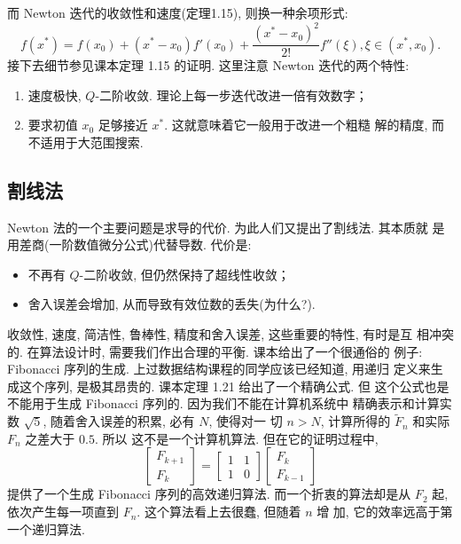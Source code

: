\documentclass[a4paper]{ctexart}
\begin{document}
而 Newton 迭代的收敛性和速度(定理1.15), 则换一种余项形式:
\[
  f(x^*) = f(x_0) + (x^* - x_0) f'(x_0) + \frac{(x^* -
    x_0)^2}{2!}f''(\xi), \xi \in (x^*, x_0).
\]
接下去细节参见课本定理 1.15 的证明. 这里注意 Newton 迭代的两个特性:
\begin{enumerate}
\item 速度极快, $Q$-二阶收敛. 理论上每一步迭代改进一倍有效数字；
\item 要求初值 $x_0$ 足够接近 $x^*$. 这就意味着它一般用于改进一个粗糙
  解的精度, 而不适用于大范围搜索.
\end{enumerate}

\subsection{割线法}

Newton 法的一个主要问题是求导的代价. 为此人们又提出了割线法. 其本质就
是用差商(一阶数值微分公式)代替导数. 代价是:
\begin{itemize}
\item 不再有 $Q$-二阶收敛, 但仍然保持了超线性收敛；
\item 舍入误差会增加, 从而导致有效位数的丢失(为什么?).
\end{itemize}
收敛性, 速度, 简洁性, 鲁棒性, 精度和舍入误差, 这些重要的特性, 有时是互
相冲突的. 在算法设计时, 需要我们作出合理的平衡. 课本给出了一个很通俗的
例子: Fibonacci 序列的生成. 上过数据结构课程的同学应该已经知道, 用递归
定义来生成这个序列, 是极其昂贵的. 课本定理 1.21 给出了一个精确公式. 但
这个公式也是不能用于生成 Fibonacci 序列的. 因为我们不能在计算机系统中
精确表示和计算实数 $\sqrt{5}$, 随着舍入误差的积累, 必有 $N$, 使得对一
切 $n > N$, 计算所得的 $\tilde{F}_n$ 和实际 $F_n$ 之差大于 $0.5$. 所以
这不是一个计算机算法. 但在它的证明过程中,
\[
  \left[\begin{array}{c}F_{k + 1} \\ F_k\end{array}\right]
  = \left[\begin{array}{cc}1 & 1 \\ 1 & 0\end{array}\right]
  \left[\begin{array}{c}F_k \\ F_{k - 1}\end{array}\right]
\]
提供了一个生成 Fibonacci 序列的高效递归算法. 而一个折衷的算法却是从
$F_2$ 起, 依次产生每一项直到 $F_n$. 这个算法看上去很蠢, 但随着 $n$ 增
加, 它的效率远高于第一个递归算法.
\end{document}
